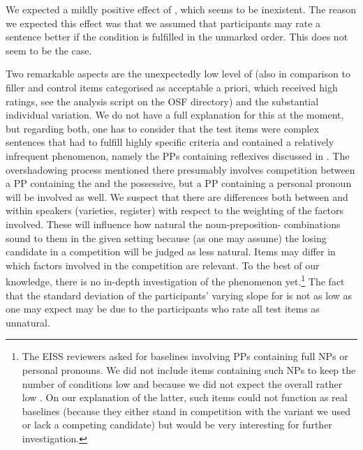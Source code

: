 \documentclass[output=paper,colorlinks,citecolor=brown]{langscibook}
\begin{document}
We expected a mildly positive effect of , which seems to be inexistent.
The reason we expected this effect was that we assumed that participants may rate a sentence better if the  condition is fulfilled in the unmarked order.
This does not seem to be the case.

Two remarkable aspects are the unexpectedly low level of  (also in comparison to filler and control items categorised as acceptable a priori, which received high ratings, see the analysis script on the OSF directory) and the substantial individual variation.
We do not have a full explanation for this at the moment, but regarding both, one has to consider that the test items were complex sentences that had to fulfill highly specific criteria and contained a relatively infrequent phenomenon, namely the PPs containing reflexives discussed in .
The overshadowing process mentioned there presumably involves competition between a PP containing the  and the possessive, but a PP containing a personal pronoun will be involved as well.
We suspect that there are differences both between and within speakers (varieties, register) with respect to the weighting of the factors involved. 
These will influence how natural the noun-preposition- combinations sound to them in the given setting because (as one may assume) the losing candidate in a competition will be judged as less natural.
Items may differ in which factors involved in the competition are relevant.
To the best of our knowledge, there is no in-depth investigation of the phenomenon yet.\footnote{The EISS reviewers asked for baselines involving PPs containing full NPs or personal pronouns. We did not include items containing such NPs to keep the number of conditions low and because we did not expect the overall rather low . On our explanation of the latter, such items could not function as real baselines (because they either stand in competition with the variant we used or lack a competing candidate) but would be very interesting for further investigation.}
The fact that the standard deviation of the participants' varying slope for  is not as low as one may expect may be due to the participants who rate all test items as unnatural.
\end{document}
